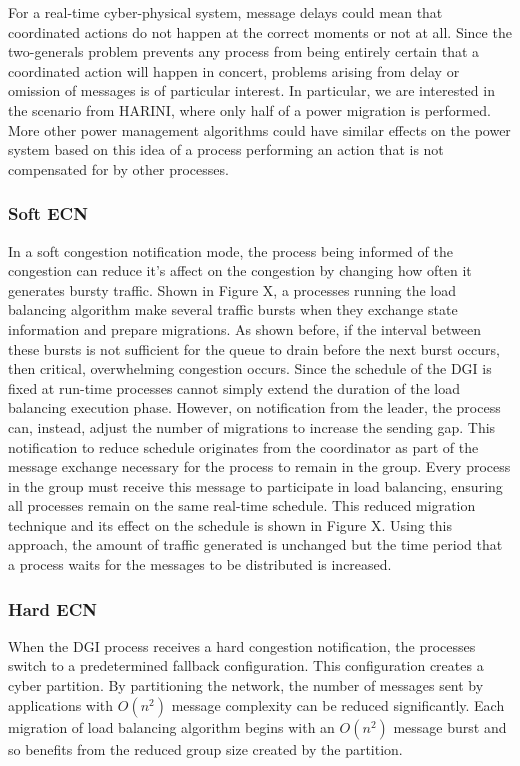 For a real-time cyber-physical system, message delays could mean that coordinated actions do not happen at the correct moments or not at all.
Since the two-generals problem prevents any process from being entirely certain that a coordinated action will happen in concert, problems arising from delay or omission of messages is of particular interest.
In particular, we are interested in the scenario from HARINI, where only half of a power migration is performed.
More other power management algorithms could have similar effects on the power system based on this idea of a process performing an action that is not compensated for by other processes.

\subsubsection{Soft \ac{ECN}}

In a soft congestion notification mode, the process being informed of the congestion can reduce it's affect on the congestion by changing how often it generates bursty traffic.
Shown in Figure X, a processes running the load balancing algorithm make several traffic bursts when they exchange state information and prepare migrations.
As shown before, if the interval between these bursts is not sufficient for the queue to drain before the next burst occurs, then critical, overwhelming congestion occurs.
Since the schedule of the \ac{DGI} is fixed at run-time processes cannot simply extend the duration of the load balancing execution phase.
However, on notification from the leader, the process can, instead, adjust the number of migrations to increase the sending gap.
This notification to reduce schedule originates from the coordinator as part of the message exchange necessary for the process to remain in the group.
Every process in the group must receive this message to participate in load balancing, ensuring all processes remain on the same real-time schedule.
This reduced migration technique and its effect on the schedule is shown in Figure X.
Using this approach, the amount of traffic generated is unchanged but the time period that a process waits for the messages to be distributed is increased.

\subsubsection{Hard \ac{ECN}}

When the \ac{DGI} process receives a hard congestion notification, the processes switch to a predetermined fallback configuration.
This configuration creates a cyber partition.
By partitioning the network, the number of messages sent by applications with $O(n^2)$ message complexity can be reduced significantly.
Each migration of load balancing algorithm begins with an $O(n^2)$ message burst and so benefits from the reduced group size created by the partition.

